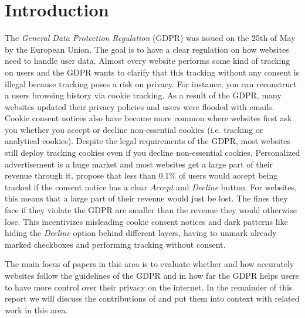 \section{Introduction}
\label{sec:intro}

The \emph{General Data Protection Regulation} (GDPR) was issued on the 25th of May by the European Union. The goal is to
have a clear regulation on how websites need to handle user data. Almost every website performs some kind of tracking on
users and the GDPR wants to clarify that this tracking without any consent is illegal because tracking poses a risk on
privacy. For instance, you can reconstruct a users browsing history via cookie tracking. As a result of the GDPR, many
websites updated their privacy policies and users were flooded with emails. Cookie consent notices also have become more
common where websites first ask you whether you accept or decline non-essential cookies (i.e. tracking or analytical
cookies). Despite the legal requirements of the GDPR, most websites still deploy tracking cookies even if you decline
non-essential cookies. Personalized advertisement is a huge market and most websites get a large
part of their revenue through it.  propose that less than 0.1\% of users
would accept being tracked if the consent notice has a clear \emph{Accept} and \emph{Decline} button. For websites, this
means that a large part of their revenue would just be lost. The fines they face if they violate the GDPR are smaller
than the revenue they would otherwise lose. This incentivizes misleading cookie consent notices and dark patterns like
hiding the \emph{Decline} option behind different layers, having to unmark already marked checkboxes and performing
tracking without consent.

The main focus of papers in this area is to evaluate whether and how accurately websites follow the guidelines of the
GDPR and in how far the GDPR helps users to have more control over their privacy on the internet.
In the remainder of this report we will discuss the contributions of  and put them into context
with related work in this area.


